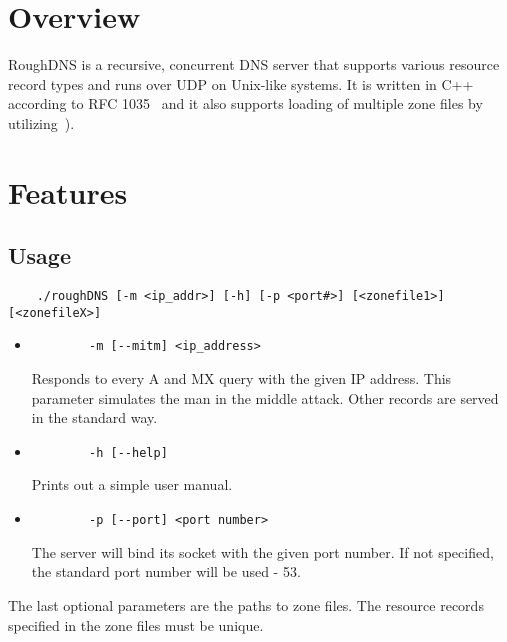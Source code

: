 \documentclass[12pt,a4paper,titlepage,final]{article}
\begin{document}


\pagestyle{plain}
\setcounter{page}{1}
\tableofcontents

\newpage
\pagestyle{plain}
\setcounter{page}{1}

\section{Overview} 
RoughDNS is a recursive, concurrent DNS server that supports various resource
record types and runs over UDP on Unix-like systems. It is written in C++
according to RFC 1035~\cite{rfc1035} and it also supports loading of multiple
zone files by utilizing~\cite{ldns}).

\section{Features} \label{sec:features}
\subsection{Usage}
\begin{verbatim}
	./roughDNS [-m <ip_addr>] [-h] [-p <port#>] [<zonefile1>] [<zonefileX>]
\end{verbatim}
\begin{itemize}
	\item
		\begin{verbatim}
		-m [--mitm] <ip_address>
		\end{verbatim}
		Responds to every A and MX query with the given IP address. This parameter
    simulates the man in the middle attack. Other records are served in the
    standard way.
	\item 
		\begin{verbatim}
		-h [--help]
		\end{verbatim}
		Prints out a simple user manual.
	\item
		\begin{verbatim}
		-p [--port] <port number>
		\end{verbatim}
		The server will bind its socket with the given port number. If not
    specified, the standard port number will be used - 53.
\end{itemize}
The last optional parameters are the paths to zone files. The resource records
specified in the zone files must be unique.
\end{document}
